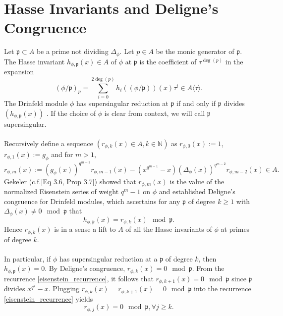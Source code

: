 \documentclass[12pt]{article}
\theoremstyle{plain}
\theoremstyle{definition}
\newcommand{\D}{\Delta}
\newcommand{\ph}{(\phi/\p)}
\newcommand{\p}{\mathfrak p}
\begin{document}
\section{Hasse Invariants and Deligne's Congruence}
Let $\p \subset A$ be a prime not dividing $\Delta_\phi$. Let $p \in A$ be the monic generator of $\p$. The Hasse invariant $h_{\phi,\p}(x) \in A$ of $\phi$ at $\p$ is the coefficient of $\tau^{\deg(p)}$ in the expansion $$\ph_p  = \sum_{i=0}^{2\deg(p)} h_i(\ph)(x) \tau^i \in A\langle \tau \rangle.$$
The Drinfeld module $\phi$ has supersingular reduction at $\p$ if and only if $\p$ divides $(h_{\phi,\p}(x))$ \cite{gos}. If the choice of $\phi$ is clear from context, we will call $\p$ supersingular.\\ \\
Recursively define a sequence $(r_{\phi,k}(x) \in A,k \in \mathbb{N})$ as $r_{\phi,0}(x):=1$, $r_{\phi,1}(x):=g_\phi$ and for $m>1$,
\begin{equation}\label{eisenstein_recurrence}
r_{\phi,m}(x) := \left(g_\phi(x)\right)^{q^{m-1}}r_{\phi,m-1}(x) - (x^{q^{m-1}}-x) \left(\D_\phi(x)\right)^{q^{m-2}} r_{\phi,m-2}(x) \in A.
\end{equation}
Gekeler (c.f.\cite{gek}[Eq 3.6, Prop 3.7]) showed that $r_{\phi,m}(x)$ is the value of the normalized Eisenstein series of weight $q^{m}-1$ on $\phi$ and established Deligne's congruence for Drinfeld modules, which ascertains for any $\p$ of degree $k \geq 1$ with $\Delta_\phi(x) \neq 0 \mod \p$ that 
\begin{equation}\label{deligne_congruence}
 h_{\phi,\p}(x) = r_{\phi,k}(x) \mod \p.
\end{equation}
Hence $r_{\phi,k}(x)$ is in a sense a lift to $A$ of all the Hasse invariants of $\phi$ at primes of degree $k$.\\ \\
In particular, if $\phi$ has supersingular reduction at a $\p$ of degree $k$, then $h_{\phi,\p}(x)=0$. By Deligne's congruence, $r_{\phi,k}(x) = 0 \mod \p$. From the recurrence \ref{eisenstein_recurrence}, it follows that $r_{\phi,k+1}(x) = 0 \mod \p$ since $\p$ divides $x^{q^k}-x$. Plugging $r_{\phi,k}(x) = r_{\phi,k+1}(x)= 0 \mod \p$ into the recurrence \ref{eisenstein_recurrence} yields  
\begin{equation}\label{supersingular_zero}
 r_{\phi,j}(x) = 0 \mod \p , \forall j \geq k.
\end{equation}
\end{document}

